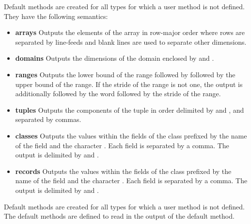 Default  methods are created for all types for which a user
 method is not defined.  They have the following semantics:
\begin{itemize}
\item
{\bf arrays} Outputs the elements of the array in row-major order
where rows are separated by line-feeds and blank lines are used to
separate other dimensions.
\item
{\bf domains} Outputs the dimensions of the domain enclosed
by \chpl{[} and \chpl{]}.
\item
{\bf ranges} Outputs the lower bound of the range followed
by  followed by the upper bound of the range.  If the stride
of the range is not one, the output is additionally followed by the
word  followed by the stride of the range.
\item
{\bf tuples} Outputs the components of the tuple in order delimited
by \chpl{(} and \chpl{)}, and separated by commas.
\item
{\bf classes} Outputs the values within the fields of the class
prefixed by the name of the field and the character \chpl{=}.  Each
field is separated by a comma.  The output is delimited by \chpl{\{}
and \chpl{\}}.
\item
{\bf records} Outputs the values within the fields of the class
prefixed by the name of the field and the character \chpl{=}.  Each
field is separated by a comma.  The output is delimited by \chpl{(}
and \chpl{)}.
\end{itemize}

Default  methods are created for all types for which a user
 method is not defined.  The default  methods are
defined to read in the output of the default  method.
